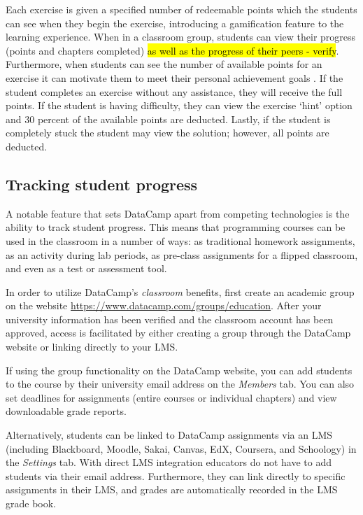 \documentclass{tise_style_doi}
\begin{document}
Each exercise is given a specified number of redeemable points which the students
can see when they begin the exercise, introducing a gamification feature to the learning
experience. When in a classroom group, students can view their progress (points and chapters
completed) \hl{as well as the progress of their peers - verify}. Furthermore, when students
can see the number of available points for an exercise it can motivate them to meet their personal
achievement goals \citep{Chang2016}. If the student completes an exercise without
any assistance, they will receive the full points. If the student is having difficulty, they can
view the exercise `hint' option and 30 percent of the available points are deducted.
Lastly, if the student is completely stuck the student may view the solution; however, all
points are deducted.

\subsection{Tracking student progress}

A notable feature that sets DataCamp apart from competing technologies is the ability
to track student progress. This means that programming courses can be used
in the classroom in a number of ways: as traditional homework assignments, as an activity
during lab periods, as pre-class assignments for a flipped classroom, and even as a
test or assessment tool.

In order to utilize DataCamp's \textit{classroom} benefits, first create an academic
group on the website \url{https://www.datacamp.com/groups/education}. After your
university information has been verified and the classroom account has been approved,
access is facilitated by either creating a group through the DataCamp website or
linking directly to your LMS.

If using the group functionality on the DataCamp website, you can add students to the course
by their university email address on the \textit{Members} tab.  You can also set deadlines
for assignments (entire courses or individual chapters) and view downloadable grade reports.

Alternatively, students can be linked to DataCamp assignments via an LMS (including
Blackboard, Moodle, Sakai, Canvas, EdX, Coursera, and Schoology) in the \textit{Settings} tab.
With direct LMS integration educators do not have to add students via their email address.
Furthermore, they can link directly to specific assignments in their LMS, and grades are
automatically recorded in the LMS grade book.
\end{document}
